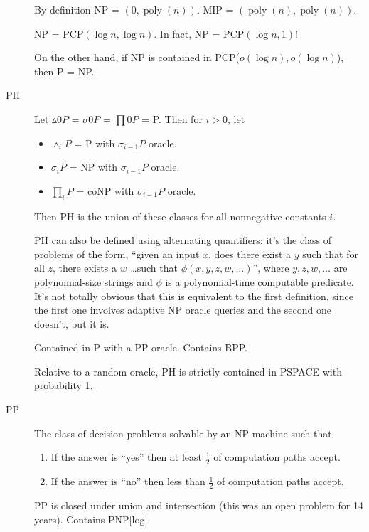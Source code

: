 \documentclass[a4paper]{article}
\newcommand{\cls}[1]{\rm{#1}}
\newcommand{\probl}[1]{\text{\textsc{#1}}}
\begin{document}
\begin{appendices}
\begin{description}
    By definition \cls{NP} = \probl{PCP}$(0,\operatorname{poly}(n))$. \cls{MIP} = \probl{PCP}$(\operatorname{poly}(n),\operatorname{poly}(n))$.

    \cls{NP} = \cls{PCP}$(\log{n}, \log{n})$. In fact, \cls{NP} = \cls{PCP}$(\log{n}, 1)$!

    On the other hand, if \cls{NP} is contained in \cls{PCP}($o(\log{n}), o(\log{n})$), then \cls{P} = \cls{NP}.

  \item[\cls{PH}] Let $\vartriangle 0P$ = $\sigma 0P$ = $\prod 0P$ = \cls{P}.  Then for $i>0$, let
    \begin{itemize}
      \item $\vartriangle_i P$ = \cls{P} with $\sigma_{i-1}P$ oracle.
      \item $\sigma_i P$ = \cls{NP} with $\sigma_{i-1}P$ oracle.
      \item $\prod_i P$ = \cls{coNP} with $\sigma_{i-1}P$ oracle.
    \end{itemize}
    Then PH is the union of these classes for all nonnegative constants $i$.

    PH can also be defined using alternating quantifiers: it's the class of problems of the form, ``given an input $x$, does there exist a $y$ such that for all $z$, there exists a $w$ \dots such that $\phi(x,y,z,w,\ldots)$'', where $y,z,w,\ldots$ are polynomial-size strings and $\phi$ is a polynomial-time computable predicate.  It's not totally obvious that this is equivalent to the first definition, since the first one involves adaptive \cls{NP} oracle queries and the second one doesn't, but it is.

    Contained in P with a \cls{PP} oracle. Contains \cls{BPP}.

    Relative to a random oracle, \cls{PH} is strictly contained in \cls{PSPACE} with probability 1.

  \item[\cls{PP}] The class of decision problems solvable by an NP machine such that
    \begin{enumerate}
      \item If the answer is ``yes'' then at least $\frac12$ of computation paths accept.
      \item If the answer is ``no'' then less than $\frac12$ of computation paths accept.
    \end{enumerate}

    \cls{PP} is closed under union and intersection (this was an open problem for 14 years). Contains \cls{PNP[log]}.


\end{description}
\end{appendices}
\end{document}
